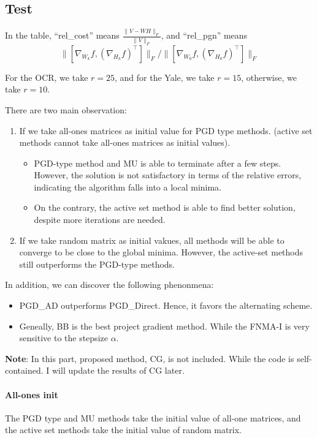 \documentclass[conference,onecolumn,12pt]{IEEEtran}
\numberwithin{equation}{section}
\numberwithin{figure}{section}
\numberwithin{table}{section}
\theoremstyle{definition}
\begin{document}
\subsection{Test}


In the table, ``rel\_cost'' means $\frac{\|V-WH\|_F}{\|V\|_F}$, and ``rel\_pgn'' means 
$$
\|\left[\nabla_{W_k} f, (\nabla_{H_k} f)^\top\right]\|_F/ \|\left[\nabla_{W_0} f, (\nabla_{H_0} f)^\top\right]\|_F
$$

For the OCR, we take $r=25$, and for the Yale, we take $r=15$, otherwise, we take $r=10$.

There are two main observation:
\begin{enumerate}
	\item If we take all-ones matrices as initial value for PGD type methods. (active set methods cannot take all-ones matrices as initial values).
	\begin{itemize}
		\item PGD-type method and MU is able to terminate after a few steps. However, the solution is not satisfactory in terms of the relative errors, indicating the algorithm falls into a local minima.
		\item On the contrary, the active set method is able to find better solution, despite more iterations are needed.
	\end{itemize}
	\item If we take random matrix as initial vakues, all methods will be able to converge to be close to the global minima. However, the active-set methods still outperforms the PGD-type methods.
\end{enumerate}

In addition, we can discover the following phenonmena:
\begin{itemize}
	\item PGD\_AD outperforms PGD\_Direct. Hence, it favors the alternating scheme.
	\item Geneally, BB is the best project gradient method. While the FNMA-I is very sensitive to the stepsize $\alpha$.
\end{itemize}

{\bf Note}: In this part, proposed method, CG, is not included. While the code is self-contained. I will update the results of CG later.

\paragraph{All-ones init}
The PGD type and MU methods take the initial value of all-one matrices, and the active set methods take the initial value of random matrix.
\end{document}
